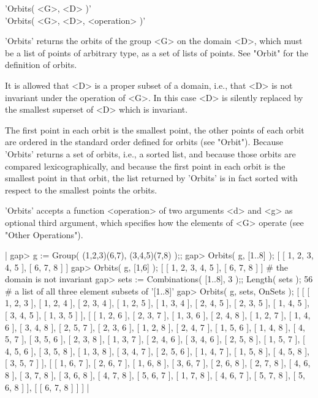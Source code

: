 
'Orbits( <G>, <D> )' \\
'Orbits( <G>, <D>, <operation> )'

'Orbits' returns  the orbits of the group  <G>  on the domain  <D>, which
must be a list of points of arbitrary type, as a set of lists of  points.
See "Orbit" for the definition of orbits.

It is allowed that <D> is a proper subset of a domain,  i.e., that <D> is
not invariant under the  operation of <G>.  In  this case <D> is silently
replaced by the smallest superset of <D> which is invariant.

The first point in each orbit is the smallest point, the  other points of
each orbit  are  ordered in the standard  order defined  for  orbits (see
"Orbit").  Because 'Orbits' returns a set of orbits, i.e., a sorted list,
and because those orbits  are compared lexicographically, and because the
first point in each orbit is the smallest point  in that orbit,  the list
returned  by 'Orbits' is in  fact  sorted  with respect  to  the smallest
points the orbits.

'Orbits' accepts a  function <operation> of two arguments <d>  and <g> as
optional third argument, which specifies how the elements of <G>  operate
(see "Other Operations").

|    gap> g := Group( (1,2,3)(6,7), (3,4,5)(7,8) );;
    gap> Orbits( g, [1..8] );
    [ [ 1, 2, 3, 4, 5 ], [ 6, 7, 8 ] ]
    gap> Orbits( g, [1,6] );
    [ [ 1, 2, 3, 4, 5 ], [ 6, 7, 8 ] ]    # the domain is not invariant
    gap> sets := Combinations( [1..8], 3 );; Length( sets );
    56    # a list of all three element subsets of '[1..8]'
    gap> Orbits( g, sets, OnSets );
    [ [ [ 1, 2, 3 ], [ 1, 2, 4 ], [ 2, 3, 4 ], [ 1, 2, 5 ], [ 1, 3, 4 ],
          [ 2, 4, 5 ], [ 2, 3, 5 ], [ 1, 4, 5 ], [ 3, 4, 5 ], [ 1, 3, 5 ]
         ],
      [ [ 1, 2, 6 ], [ 2, 3, 7 ], [ 1, 3, 6 ], [ 2, 4, 8 ], [ 1, 2, 7 ],
          [ 1, 4, 6 ], [ 3, 4, 8 ], [ 2, 5, 7 ], [ 2, 3, 6 ],
          [ 1, 2, 8 ], [ 2, 4, 7 ], [ 1, 5, 6 ], [ 1, 4, 8 ],
          [ 4, 5, 7 ], [ 3, 5, 6 ], [ 2, 3, 8 ], [ 1, 3, 7 ],
          [ 2, 4, 6 ], [ 3, 4, 6 ], [ 2, 5, 8 ], [ 1, 5, 7 ],
          [ 4, 5, 6 ], [ 3, 5, 8 ], [ 1, 3, 8 ], [ 3, 4, 7 ],
          [ 2, 5, 6 ], [ 1, 4, 7 ], [ 1, 5, 8 ], [ 4, 5, 8 ], [ 3, 5, 7 ]
         ],
      [ [ 1, 6, 7 ], [ 2, 6, 7 ], [ 1, 6, 8 ], [ 3, 6, 7 ], [ 2, 6, 8 ],
          [ 2, 7, 8 ], [ 4, 6, 8 ], [ 3, 7, 8 ], [ 3, 6, 8 ],
          [ 4, 7, 8 ], [ 5, 6, 7 ], [ 1, 7, 8 ], [ 4, 6, 7 ],
          [ 5, 7, 8 ], [ 5, 6, 8 ] ], [ [ 6, 7, 8 ] ] ] |

